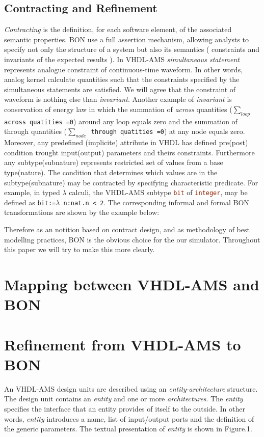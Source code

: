 \documentclass{article}
\def\lstinlinenc{\lstinline[language=VHDL,basicstyle=\normalsize\bfseries]}
\newcommand{\ent}{\emph{entity}\xspace}
\newcommand{\arch}{\emph{architecture}\xspace}
\newcommand{\archs}{\emph{architectures}\xspace}
\newcommand{\arcoss}{\emph{across}\xspace}
\begin{document}
\subsection{Contracting and Refinement}
\emph{Contracting} is the definition, for each software element, 
of the associated semantic properties. BON use a full assertion mechanism, 
allowing analysts to specify not only the structure of a system but also its
semantics ( constraints and invariants of the expected results ). 
In VHDL-AMS \emph{simultaneous statement} represents analogue constraint of 
continuous-time waveform. In other words, analog kernel calculate quantities such 
that the constraints specified by the simultaneous statements are satisfied. 
We will agree that the constraint of waveform is nothing else than \emph{invariant}.
Another example of \emph{invariant} is conservation of energy law in which 
the summation of \arcoss quantities (\texttt{$\sum_{loop}$ across quatities =0}) 
around any loop equals zero and the summation of through 
quantities (\texttt{$\sum_{node}$ through quatities =0}) at any node equals zero. 
Moreover, any predefined (implicite) attribute in VHDL 
has defined pre(post) condition trought input(output) 
parameters and theirs constraints. Furthermore any subtype(subnature) 
represents restricted set of values from a base type(nature). 
The condition that determines which values are in the subtype(subnature)  
may be contracted by specifying characteristic predicate. 
For example, in typed $\lambda$ calculi, the VHDL-AMS subtype \lstinlinenc|bit| of 
\lstinlinenc|integer|, may be defined as \texttt{bit:=$\lambda$ n:nat.n < 2}. 
The corresponding informal and formal BON transformations are shown 
by the example below:

Therefore as an notition based on contract design, and as  methodology of 
best modelling practices, BON is the obvious choice for the our simulator.
Throughout this paper we will try to make this more clearly.  

\section{Mapping between VHDL-AMS and BON}


\section{Refinement from VHDL-AMS to BON }
 
An VHDL-AMS design units are described using an \ent-\arch structure. 
The design unit contains an \ent and one or more \archs. 
The \ent specifies the interface that an entity provides of itself 
to the outside. In other words, \ent introduces a name, list of 
input/output ports and the definition of the generic parameters. 
The textual presentation of \ent is shown in Figure.1. 

 
\end{document}
